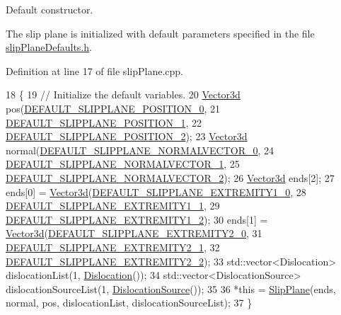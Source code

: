 Default constructor. 

The slip plane is initialized with default parameters specified in the file \hyperlink{slipPlaneDefaults_8h}{slip\-Plane\-Defaults.\-h}. 

Definition at line 17 of file slip\-Plane.\-cpp.


\begin{DoxyCode}
18 \{
19   \textcolor{comment}{// Initialize the default variables.}
20   \hyperlink{classVector3d}{Vector3d} pos(\hyperlink{slipPlaneDefaults_8h_ae29e6a5bc5227e2945999e3de19b62cb}{DEFAULT\_SLIPPLANE\_POSITION\_0},
21                \hyperlink{slipPlaneDefaults_8h_ad2b0c38ccedf6a9ae18ea35c00a8add6}{DEFAULT\_SLIPPLANE\_POSITION\_1},
22                \hyperlink{slipPlaneDefaults_8h_a8bf3c785063ee4e23c0556facafb21b7}{DEFAULT\_SLIPPLANE\_POSITION\_2});
23   \hyperlink{classVector3d}{Vector3d} normal(\hyperlink{slipPlaneDefaults_8h_a878b258803d3a3c7e3d08bbee980fd4a}{DEFAULT\_SLIPPLANE\_NORMALVECTOR\_0},
24                   \hyperlink{slipPlaneDefaults_8h_aabaf0c54179b6342699274ccc4ee0c61}{DEFAULT\_SLIPPLANE\_NORMALVECTOR\_1},
25                   \hyperlink{slipPlaneDefaults_8h_a7238023cd2f9b1da60a5cda8316853bd}{DEFAULT\_SLIPPLANE\_NORMALVECTOR\_2});
26   \hyperlink{classVector3d}{Vector3d} ends[2];
27   ends[0] = \hyperlink{classVector3d}{Vector3d}(\hyperlink{slipPlaneDefaults_8h_a6a719238e050049e5acb1e283b913b6a}{DEFAULT\_SLIPPLANE\_EXTREMITY1\_0},
28                      \hyperlink{slipPlaneDefaults_8h_ae6188b63772b2910bc45bc85f95a1dbc}{DEFAULT\_SLIPPLANE\_EXTREMITY1\_1},
29                      \hyperlink{slipPlaneDefaults_8h_ad2be46a9c0ff8512114ea28043663632}{DEFAULT\_SLIPPLANE\_EXTREMITY1\_2});
30   ends[1] = \hyperlink{classVector3d}{Vector3d}(\hyperlink{slipPlaneDefaults_8h_ac40bbdb42f28eab9f78dc2a971c5f6be}{DEFAULT\_SLIPPLANE\_EXTREMITY2\_0},
31                      \hyperlink{slipPlaneDefaults_8h_ad4705539cc00f32e4f014f21b27004b3}{DEFAULT\_SLIPPLANE\_EXTREMITY2\_1},
32                      \hyperlink{slipPlaneDefaults_8h_a085a324562954a19521d16df00e63848}{DEFAULT\_SLIPPLANE\_EXTREMITY2\_2});
33   std::vector<Dislocation> dislocationList(1, \hyperlink{classDislocation}{Dislocation}());
34   std::vector<DislocationSource> dislocationSourceList(1, \hyperlink{classDislocationSource}{DislocationSource}());
35   
36   *\textcolor{keyword}{this} = \hyperlink{classSlipPlane_a0d73579f211b7059ee2af1a2816f4eb2}{SlipPlane}(ends, normal, pos, dislocationList, dislocationSourceList);
37 \}
\end{DoxyCode}
